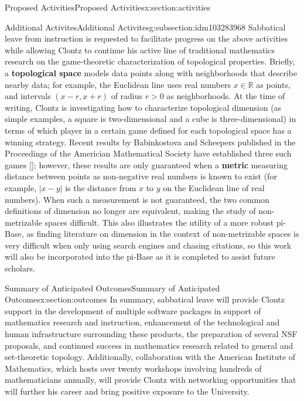 \documentclass[oneside,10pt,]{article}
\newcommand{\xreffont}{\relax}
\newcommand{\terminology}[1]{\textbf{#1}}
\begin{document}
\begin{sectionptx}{Proposed Activities}{}{Proposed Activities}{}{}{x:section:activities}
\begin{subsectionptx}{Additional Activites}{}{Additional Activites}{}{}{g:subsection:idm103283968}
Sabbatical leave from instruction is requested to facilitate progress on the above activities while allowing Clontz to continue his active line of traditional mathematics research on the game-theoretic characterization of topological properties. Briefly, a \terminology{topological space} models data points along with neighborhoods that describe nearby data; for example, the Euclidean line uses real numbers \(x\in\mathbb R\) as points, and intervals \((x-r,x+r)\) of radius \(r>0\) as neighborhoods. At the time of writing, Clontz is investigating how to characterize topological dimension (as simple examples, a square is two-dimensional and a cube is three-dimensional) in terms of which player in a certain game defined for each topological space has a winning strategy. Recent results by Babinkostova and Scheepers published in the Proceedings of the Americian Mathematical Society have established three such games \hyperlink{x:biblio:biblio-scheepers}{[{\xreffont 3}]}; however, these results are only guaranteed when a \terminology{metric} measuring distance between points as non-negative real numbers is known to exist (for example, \(|x-y|\) is the distance from \(x\) to \(y\) on the Euclidean line of real numbers). When such a measurement is not guaranteed, the two common definitions of dimension no longer are equivalent, making the study of non-metrizable spaces difficult. This also illustrates the utility of a more robust pi-Base, as finding literature on dimension in the context of non-metrizable spaces is very difficult when only using search engines and chasing citations, so this work will also be incorporated into the pi-Base as it is completed to assist future scholars.%
\end{subsectionptx}
\end{sectionptx}
%
%
\typeout{************************************************}
\typeout{************************************************}
%
\begin{sectionptx}{Summary of Anticipated Outcomes}{}{Summary of Anticipated Outcomes}{}{}{x:section:outcomes}
In summary, sabbatical leave will provide Clontz support in the development of multiple software packages in support of mathematics research and instruction, enhancement of the technological and human infrastructure surrounding these products, the preparation of several NSF proposals, and continued success in mathematics research related to general and set-theoretic topology. Additionally, collaboration with the American Institute of Mathematics, which hosts over twenty workshops involving hundreds of mathematicians annually, will provide Clontz with networking opportunities that will further his career and bring positive exposure to the University.%
\end{sectionptx}
\end{document}
